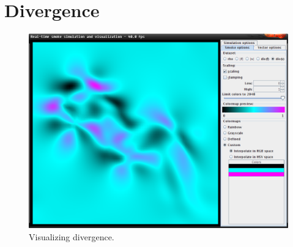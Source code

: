 \documentclass[a4paper,11pt,twoside]{report}
\begin{document}
%
	\section{Divergence}
		\begin{figure}[h]
		\centering
		\includegraphics[scale=\imagescalefactor]{images/step4.png}
		\caption{Visualizing divergence.}\label{fig:step4}
		\end{figure}
		\newpage
\end{document}
